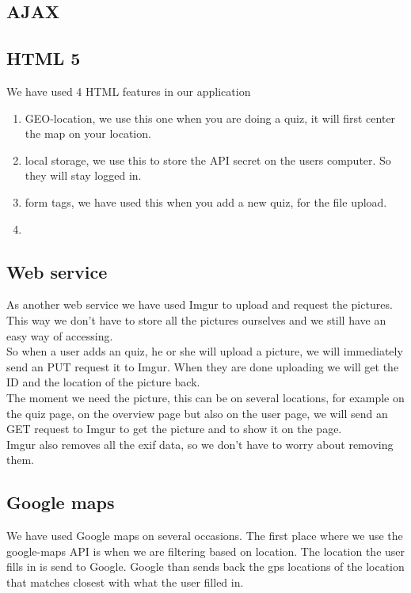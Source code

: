\documentclass[11pt, oneside]{article}   	%
\begin{document}
\subsection{AJAX}

\subsection{HTML 5}
We have used 4 HTML features in our application
\begin{enumerate}
\item GEO-location, we use this one when you are doing a quiz, it will first center the map on your location.
\item local storage, we use this to store the API secret on the users computer. So they will stay logged in.
\item form tags, we have used this when you add a new quiz, for the file upload.
\item %
\end{enumerate}


\subsection{Web service}
As another web service we have used Imgur to upload and request the pictures. This way we don't have to store all the pictures ourselves and we still have an easy way of accessing. \\
So when a user adds an quiz, he or she will upload a picture, we will immediately send an PUT request it to Imgur. When they are done uploading we will get the ID and the location of the picture back. \\
The moment we need the picture, this can be on several locations, for example on the quiz page, on the overview page but also on the user page, we will send an GET request to Imgur to get the picture and to show it on the page.\\
Imgur also removes all the exif data, so we don't have to worry about removing them.  

\subsection{Google maps}
We have used Google maps on several occasions.
The first place where we use the google-maps API is when we are filtering based on location. The location the user fills in is send to Google. Google than sends back the gps locations of the location that matches closest with what the user filled in. \\
\end{document}

